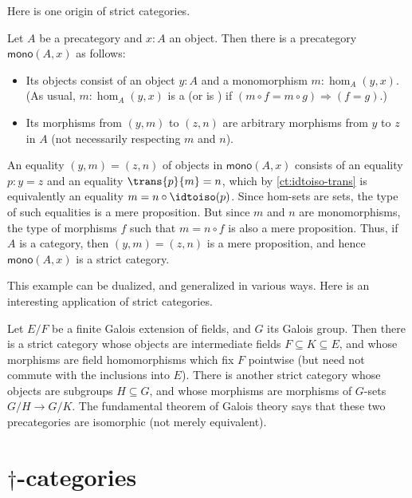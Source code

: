 Here is one origin of strict categories.

\begin{eg}\label{ct:mono-cat}
  Let $A$ be a precategory and $x:A$ an object.
  Then there is a precategory $\mathsf{mono}(A,x)$ as follows:
  \begin{itemize}
  \item Its objects consist of an object $y:A$ and a monomorphism $m:\hom_A(y,x)$.
    (As usual, $m:\hom_A(y,x)$ is a  (or is ) if $(m\circ f = m\circ g) \Rightarrow (f=g)$.)
  \item Its morphisms from $(y,m)$ to $(z,n)$ are arbitrary morphisms from $y$ to $z$ in $A$ (not necessarily respecting $m$ and $n$).
  \end{itemize}
  An equality $(y,m)=(z,n)$ of objects in $\mathsf{mono}(A,x)$ consists of an equality $p:y=z$ and an equality $\trans{p}{m}=n$, which by \cref{ct:idtoiso-trans} is equivalently an equality $m=n\circ \idtoiso(p)$.
  Since hom-sets are sets, the type of such equalities is a mere proposition.
  But since $m$ and $n$ are monomorphisms, the type of morphisms $f$ such that $m = n\circ f$ is also a mere proposition.
  Thus, if $A$ is a category, then $(y,m)=(z,n)$ is a mere proposition, and hence $\mathsf{mono}(A,x)$ is a strict category.
\end{eg}

This example can be dualized, and generalized in various ways.
Here is an interesting application of strict categories.

\begin{eg}\label{ct:galois}
  Let $E/F$ be a finite Galois extension
  of fields, and $G$ its Galois group.
  Then there is a strict category whose objects are intermediate fields $F\subseteq K\subseteq E$, and whose morphisms are field homomorphisms which fix $F$ pointwise (but need not commute with the inclusions into $E$).
  There is another strict category whose objects are subgroups $H\subseteq G$, and whose morphisms are morphisms of $G$-sets $G/H \to G/K$.
  The fundamental theorem of Galois theory
  says that these two precategories are isomorphic (not merely equivalent).
\end{eg}

%

\section{\texorpdfstring{$\dagger$}{†}-categories}
\label{sec:dagger-categories}

